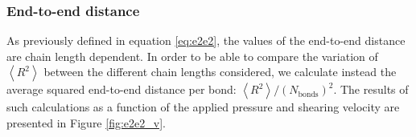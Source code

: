 \documentclass[aps,prb,reprint,superscriptaddress, a4paper]{revtex4-1}
\begin{document}



\subsubsection{End-to-end distance}

As previously defined in equation \ref{eq:e2e2}, the values of  the end-to-end distance are chain length dependent. In order to be able to compare the variation of $\left< R^2 \right> $ between the different chain lengths considered, we calculate instead the average squared end-to-end distance per bond: $\left< R^2 \right>/\left(N_\text{bonds}\right)^2$. The results of such calculations as a function of the applied pressure and shearing velocity are presented in Figure   \ref{fig:e2e2_v}.
\end{document}
